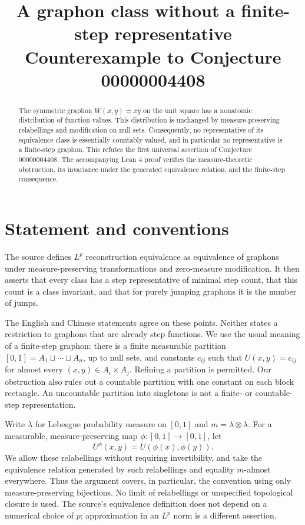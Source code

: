 \documentclass[11pt]{article}
\title{A graphon class without a finite-step representative\\
\large Counterexample to Conjecture 00000004408}
\author{}
\date{}
\begin{document}
\maketitle
\vspace{-1.8em}

\begin{abstract}
The symmetric graphon $W(x,y)=xy$ on the unit square has a nonatomic
distribution of function values. This distribution is unchanged by
measure-preserving relabellings and modification on null sets. Consequently,
no representative of its equivalence class is essentially countably valued,
and in particular no representative is a finite-step graphon. This refutes
the first universal assertion of Conjecture 00000004408. The accompanying
Lean 4 proof verifies the measure-theoretic obstruction, its invariance
under the generated equivalence relation, and the finite-step consequence.
\end{abstract}

\section{Statement and conventions}
The source defines $L^p$ reconstruction equivalence as equivalence of
graphons under measure-preserving transformations and zero-measure
modification. It then asserts that every class has a step representative
of minimal step count, that this count is a class invariant, and that for
purely jumping graphons it is the number of jumps.

The English and Chinese statements agree on these points. Neither states
a restriction to graphons that are already step functions. We use the
usual meaning of a finite-step graphon: there is a finite measurable
partition $[0,1]=A_1\sqcup\cdots\sqcup A_n$, up to null sets, and constants
$c_{ij}$ such that $U(x,y)=c_{ij}$ for almost every
$(x,y)\in A_i\times A_j$. Refining a partition is permitted. Our obstruction
also rules out a countable partition with one constant on each block
rectangle. An uncountable partition into singletons is not a finite- or
countable-step representation.

Write $\lambda$ for Lebesgue probability measure on $[0,1]$ and
$m=\lambda\otimes\lambda$. For a measurable, measure-preserving map
$\phi:[0,1]\to[0,1]$, let
\[
 U^\phi(x,y)=U(\phi(x),\phi(y)).
\]
We allow these relabellings without requiring invertibility, and take the
equivalence relation generated by such relabellings and equality $m$-almost
everywhere. Thus the argument covers, in particular, the convention using
only measure-preserving bijections. No limit of relabellings or unspecified
topological closure is used. The source's equivalence definition does not
depend on a numerical choice of $p$; approximation in an $L^p$ norm is a
different assertion.
\end{document}
